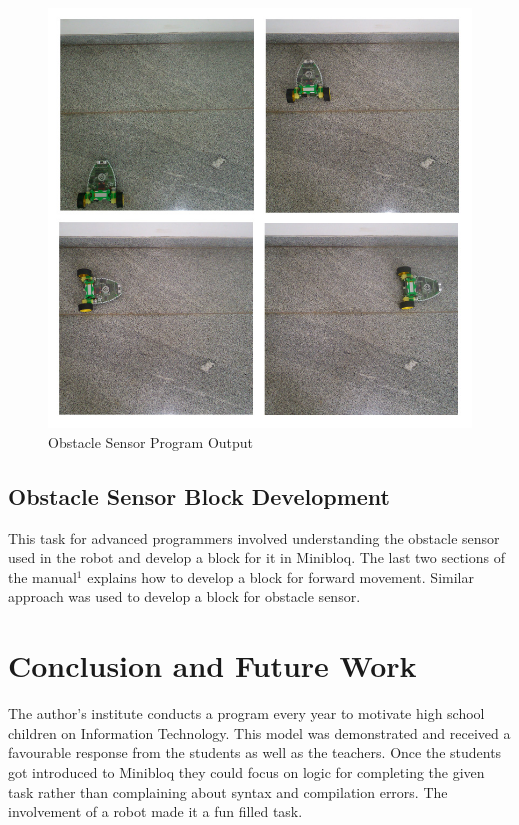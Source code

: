 \documentclass[conference]{IEEEtran}
\begin{document}
\begin{figure}[h]
\centering
\includegraphics[scale=0.3]{Fig_16.png}
\caption{Obstacle Sensor Program Output}
\end{figure}

\subsection{Obstacle Sensor Block Development}

This task for advanced programmers involved understanding the obstacle sensor used in the robot and develop a block for it in Minibloq. The last two sections of the manual$^1$ explains how to develop a block for forward movement. Similar approach was used to develop a block for obstacle sensor.

\section{Conclusion and Future Work}

The author's institute conducts a program every year to motivate high school children on Information Technology. This model was demonstrated and received a favourable response from the students as well as the teachers. Once the students got introduced to Minibloq they could focus on logic for completing the given task rather than complaining about syntax and compilation errors. The involvement of a robot made it a fun filled task. 
\end{document}
